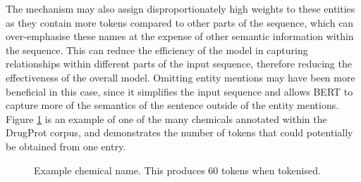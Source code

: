 \documentclass{l4proj}
\begin{document}
The mechanism may also assign disproportionately high weights to these entities as they contain more tokens compared to other parts of the sequence, which can over-emphasise these names at the expense of other semantic information within the sequence. This can reduce the efficiency of the model in capturing relationships within different parts of the input sequence, therefore reducing the effectiveness of the overall model. Omitting entity mentions may have been more beneficial in this case, since it simplifies the input sequence and allows BERT to capture more of the semantics of the sentence outside of the entity mentions. Figure \ref{fig:Long} is an example of one of the many chemicals annotated within the DrugProt corpus, and demonstrates the number of tokens that could potentially be obtained from one entry. 

\begin{figure}[h]
    \centering
  \caption{Example chemical name. This produces 60 tokens when tokenised.}
  \label{fig:Long}
\end{figure}




\end{document}
